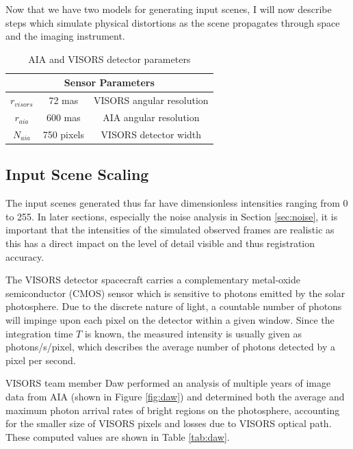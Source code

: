 \documentclass[tocnosub,noragright,centerchapter,12pt]{uiucecethesis09}
\begin{document}
Now that we have two models for generating input scenes, I will now describe steps which simulate physical distortions as the scene propagates through space and the imaging instrument.

\begin{table}
  \begin{center}
    \begin{tabular}{|c|c|c|}
      \hline
      \multicolumn{3}{|c|}{Sensor Parameters} \\
      \hline
      $r_{visors}$ & 72 mas & VISORS angular resolution \\
      $r_{aia}$ & 600 mas & AIA angular resolution \\
      $N_{aia}$ & 750 pixels & VISORS detector width \\
      \hline
    \end{tabular}
    \caption{AIA and VISORS detector parameters}
    \label{tab:params}
  \end{center}
\end{table}

\subsection{Input Scene Scaling}

The input scenes generated thus far have dimensionless intensities ranging from 0 to 255.  In later sections, especially the noise analysis in Section \ref{sec:noise}, it is important that the intensities of the simulated observed frames are realistic as this has a direct impact on the level of detail visible and thus registration accuracy. 

The VISORS detector spacecraft carries a complementary metal-oxide semiconductor (CMOS) sensor which is sensitive to photons emitted by the solar photosphere.  Due to the discrete nature of light, a countable number of photons will impinge upon each pixel on the detector within a given window.  Since the integration time $T$ is known, the measured intensity is usually given as photons/s/pixel, which describes the average number of photons detected by a pixel per second.

VISORS team member Daw performed an analysis of multiple years of image data from AIA (shown in Figure \ref{fig:daw}) and determined both the average and maximum photon arrival rates of bright regions on the photosphere, accounting for the smaller size of VISORS pixels and losses due to VISORS optical path.  These computed values are shown in Table \ref{tab:daw}.
\end{document}
